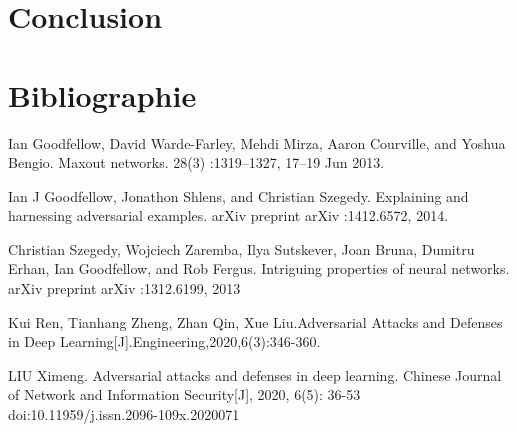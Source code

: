 \documentclass{article}
\begin{document}
\section{Conclusion}
\label{sec:conclusion}


\section{Bibliographie}


Ian Goodfellow, David Warde-Farley, Mehdi Mirza, Aaron Courville, and Yoshua Bengio. Maxout networks. 28(3) :1319–1327, 17–19 Jun 2013.

Ian J Goodfellow, Jonathon Shlens, and Christian Szegedy. Explaining and harnessing adversarial examples. arXiv preprint arXiv :1412.6572, 2014.

Christian Szegedy, Wojciech Zaremba, Ilya Sutskever, Joan Bruna, Dumitru Erhan, Ian Goodfellow, and Rob Fergus. Intriguing properties of neural networks. arXiv preprint arXiv :1312.6199, 2013

Kui Ren, Tianhang Zheng, Zhan Qin, Xue Liu.Adversarial Attacks and Defenses in Deep Learning[J].Engineering,2020,6(3):346-360.

LIU Ximeng. Adversarial attacks and defenses in deep learning. Chinese Journal of Network and Information Security[J], 2020, 6(5): 36-53 doi:10.11959/j.issn.2096-109x.2020071




\end{document}
